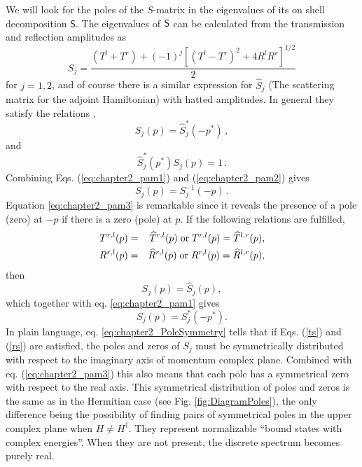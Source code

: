 We will look for the poles of the $S$-matrix in the eigenvalues of its on shell decomposition $\mathsf{S}$. The eigenvalues of $\sf{S}$ can be calculated from the transmission and reflection amplitudes as
%
\begin{equation}
	S_j=\frac{(T^l+T^r)+(-1)^j[(T^l-T^r)^2+4R^lR^r]^{1/2}}{2}
	\label{eq:chapter2_SEigenvalues}
\end{equation}
%
for $j=1,2$, and of course there is a similar expression for $\widehat{S}_j$ (The scattering matrix for the adjoint Hamiltonian) with hatted amplitudes.
In general they satisfy the relations \cite{Muga2004},
%
\begin{equation}\label{eq:chapter2_pam1}
	S_j(p)=\widehat{S}_j^*(-p^*)\,,
\end{equation}
%
and
%
\begin{equation}\label{eq:chapter2_pam2}
	\widehat{S}_j^*(p^*)S_j(p)=1\,.
\end{equation}
%
Combining Eqs. (\ref{eq:chapter2_pam1}) and (\ref{eq:chapter2_pam2}) gives
%
\begin{equation}\label{eq:chapter2_pam3}
	S_j(p)=S^{-1}_j(-p)\,.
\end{equation}
%
Equation \eqref{eq:chapter2_pam3} is remarkable since it reveals the presence of a pole (zero) at $-p$ if there is a zero (pole) at $p$.
%
If the following relations are fulfilled,
%
\begin{eqnarray}
	T^{r,l}(p)&=&\widehat{T}^{r,l}(p)\; {\rm or}\; T^{r,l}(p)=\widehat{T}^{l,r}(p),
	\label{ts}
	\\
	R^{r,l}(p)&=&\widehat{R}^{r,l}(p)\; {\rm or}\; R^{r,l}(p)=\widehat{R}^{l,r}(p),
	\label{rs}
\end{eqnarray}
%
then
%
\begin{equation}
	S_j(p)=\widehat{S}_j(p),
\end{equation}
%
which together with eq. \eqref{eq:chapter2_pam1} gives
%
\begin{equation}
	S_j(p)=S_j^*(-p^*).
	\label{eq:chapter2_PoleSymmetry}
\end{equation}
In plain language, eq. \eqref{eq:chapter2_PoleSymmetry} tells that if Eqs. (\ref{ts}) and (\ref{rs}) are satisfied,  the poles and zeros of $S_j$ must be symmetrically distributed with respect to the imaginary axis of momentum complex plane. Combined with eq. (\ref{eq:chapter2_pam3})
this also means that each pole has a symmetrical zero with respect to the real axis. This symmetrical distribution of poles and zeros is the same as in the Hermitian case (see Fig. \ref{fig:DiagramPoles}),
the only difference being the possibility
of finding pairs of symmetrical poles in the upper complex plane when $H\neq H^\dagger$. They represent normalizable ``bound states
with complex energies''. When they  are not present, the discrete spectrum becomes purely real.

